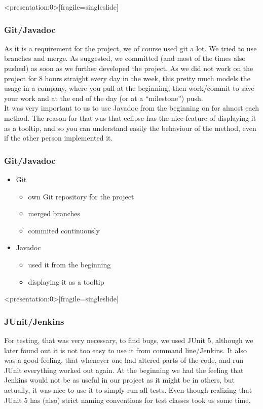 	
	\begin{frame}<presentation:0>[fragile=singleslide]
		\frametitle{Git/Javadoc}
	As it is a requirement for the project, we of course used git a lot. We tried to use branches and merge. As suggested, we committed (and most of the times also pushed) as soon as we further developed the project. As we did not work on the project for 8 hours straight every day in the week, this pretty much models the usage in a company, where you pull at the beginning, then work/commit to save your work and at the end of the day (or at a ``milestone'') push.\\
	It was very important to us to use Javadoc from the beginning on for almost each method. The reason for that was that eclipse has the nice feature of displaying it as a tooltip, and so you can understand easily the behaviour of the method, even if the other person implemented it.
  \end{frame}

	\begin{frame}[fragile=singleslide]
		\frametitle{Git/Javadoc}
		\begin{itemize}
			\item Git
			\begin{itemize}
				\item own Git repository for the project 
				\item merged branches
				\item commited continuously
			\end{itemize}
			\item Javadoc
			\begin{itemize}
				\item used it from the beginning
				\item displaying it as a tooltip
			\end{itemize}
		\end{itemize}
  \end{frame}
	\begin{frame}<presentation:0>[fragile=singleslide]
			\frametitle{JUnit/Jenkins}
	For testing, that was very necessary, to find bugs, we used JUnit 5, although we later found out it is not too easy to use it from command line/Jenkins. It also was a good feeling, that whenever one had altered parts of the code, and run JUnit everything worked out again. At the beginning we had the feeling that Jenkins would not be as useful in our project as it might be in others, but actually, it was nice to use it to simply run all tests. Even though realizing that JUnit 5 has (also) strict naming conventions for test classes took us some time.
  \end{frame}
	
